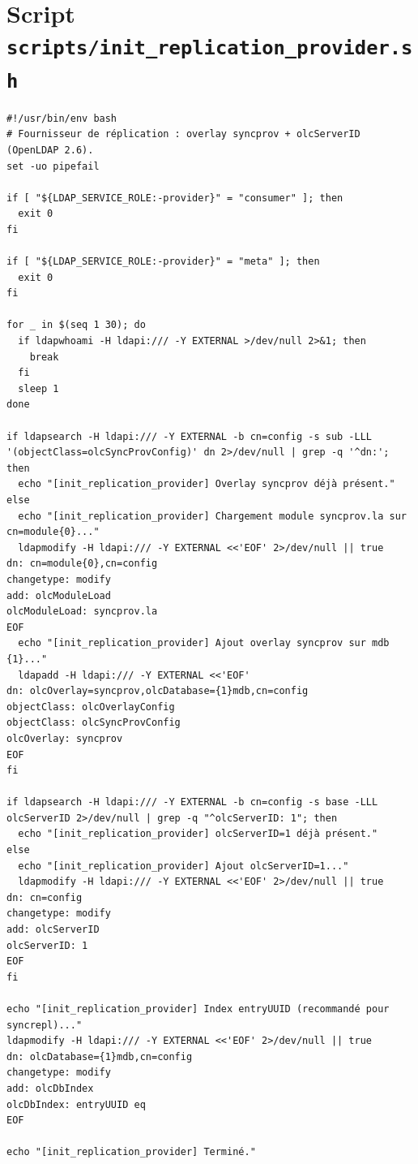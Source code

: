 \section{Script \texttt{scripts/init\_replication\_provider.sh}}\label{ann:repl-provider}
{\footnotesize
\begin{verbatim}
#!/usr/bin/env bash
# Fournisseur de réplication : overlay syncprov + olcServerID (OpenLDAP 2.6).
set -uo pipefail

if [ "${LDAP_SERVICE_ROLE:-provider}" = "consumer" ]; then
  exit 0
fi

if [ "${LDAP_SERVICE_ROLE:-provider}" = "meta" ]; then
  exit 0
fi

for _ in $(seq 1 30); do
  if ldapwhoami -H ldapi:/// -Y EXTERNAL >/dev/null 2>&1; then
    break
  fi
  sleep 1
done

if ldapsearch -H ldapi:/// -Y EXTERNAL -b cn=config -s sub -LLL '(objectClass=olcSyncProvConfig)' dn 2>/dev/null | grep -q '^dn:'; then
  echo "[init_replication_provider] Overlay syncprov déjà présent."
else
  echo "[init_replication_provider] Chargement module syncprov.la sur cn=module{0}..."
  ldapmodify -H ldapi:/// -Y EXTERNAL <<'EOF' 2>/dev/null || true
dn: cn=module{0},cn=config
changetype: modify
add: olcModuleLoad
olcModuleLoad: syncprov.la
EOF
  echo "[init_replication_provider] Ajout overlay syncprov sur mdb {1}..."
  ldapadd -H ldapi:/// -Y EXTERNAL <<'EOF'
dn: olcOverlay=syncprov,olcDatabase={1}mdb,cn=config
objectClass: olcOverlayConfig
objectClass: olcSyncProvConfig
olcOverlay: syncprov
EOF
fi

if ldapsearch -H ldapi:/// -Y EXTERNAL -b cn=config -s base -LLL olcServerID 2>/dev/null | grep -q "^olcServerID: 1"; then
  echo "[init_replication_provider] olcServerID=1 déjà présent."
else
  echo "[init_replication_provider] Ajout olcServerID=1..."
  ldapmodify -H ldapi:/// -Y EXTERNAL <<'EOF' 2>/dev/null || true
dn: cn=config
changetype: modify
add: olcServerID
olcServerID: 1
EOF
fi

echo "[init_replication_provider] Index entryUUID (recommandé pour syncrepl)..."
ldapmodify -H ldapi:/// -Y EXTERNAL <<'EOF' 2>/dev/null || true
dn: olcDatabase={1}mdb,cn=config
changetype: modify
add: olcDbIndex
olcDbIndex: entryUUID eq
EOF

echo "[init_replication_provider] Terminé."
\end{verbatim}
}

